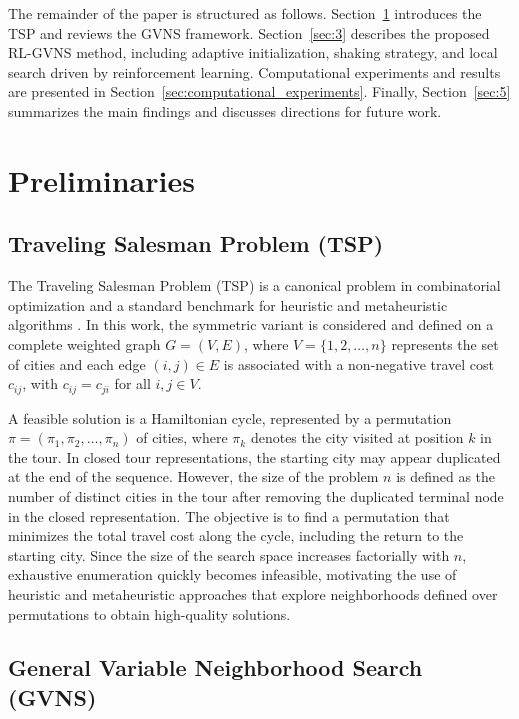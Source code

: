 \documentclass[runningheads]{llncs}
\begin{document}
The remainder of the paper is structured as follows. 
Section~\ref{sec:2} introduces the TSP and reviews the GVNS framework. 
Section~\ref{sec:3} describes the proposed RL-GVNS method, including adaptive initialization, shaking strategy, and local search driven by reinforcement learning. 
Computational experiments and results are presented in Section~\ref{sec:computational_experiments}. 
Finally, Section~\ref{sec:5} summarizes the main findings and discusses directions for future work.

\section{Preliminaries}
\label{sec:2}

\subsection{Traveling Salesman Problem (TSP)}

The Traveling Salesman Problem (TSP) is a canonical problem in combinatorial optimization and a standard benchmark for heuristic and metaheuristic algorithms \cite{osman1996meta}. In this work, the symmetric variant is considered and defined on a complete weighted graph $G=(V,E)$, where $V=\{1,2,\ldots,n\}$ represents the set of cities and each edge $(i,j)\in E$ is associated with a non-negative travel cost $c_{ij}$, with $c_{ij}=c_{ji}$ for all $i,j\in V$. 

A feasible solution is a Hamiltonian cycle, represented by a permutation $\pi=(\pi_1,\pi_2,\ldots,\pi_n)$ of cities, where $\pi_k$ denotes the city visited at position $k$ in the tour. In closed tour representations, the starting city may appear duplicated at the end of the sequence. However, the size of the problem $n$ is defined as the number of distinct cities in the tour after removing the duplicated terminal node in the closed representation. The objective is to find a permutation that minimizes the total travel cost along the cycle, including the return to the starting city. Since the size of the search space increases factorially with $n$, exhaustive enumeration quickly becomes infeasible, motivating the use of heuristic and metaheuristic approaches that explore neighborhoods defined over permutations to obtain high-quality solutions.

\subsection{General Variable Neighborhood Search (GVNS)}
\end{document}
